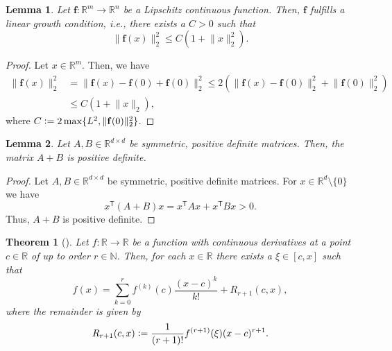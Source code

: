 \documentclass[12pt]{article}
\newtheorem{theorem}{Theorem}[section]
\newtheorem{lemma}[lemma]{Lemma}
\theoremstyle{definition}
\numberwithin{equation}{section}
\newcommand{\N}{\mathbb{N}}
\newcommand{\R}{\mathbb{R}}
\newcommand{\T}{\mathsf{T}}
\newcommand{\norm}[1]{\lVert{#1}\rVert_2}
\newcommand{\defeq}{\vcentcolon=}
\begin{document}
\begin{lemma}
  \label{lemma:linear_growth}
  Let $\mathbf{f} : \R^m \rightarrow \R^n$ be a Lipschitz continuous function. Then, $\mathbf{f}$ fulfills a linear growth condition, i.e., there exists a $C > 0$ such that 
  \begin{equation*}
    \norm{\mathbf{f}(x)}^2 \leq C (1 + \norm{x}^2).
  \end{equation*}
\end{lemma}
\begin{proof}
  Let $x \in \R^m$. Then, we have
  \begin{align*}
    \norm{\mathbf{f}(x)}^2 &= \norm{\mathbf{f}(x) - \mathbf{f}(0) + \mathbf{f}(0)}^2 \leq 2 \left( \norm{\mathbf{f}(x) - \mathbf{f}(0)}^2 + \norm{\mathbf{f}(0)}^2\right) \\
    &\leq C(1+\norm{x}),
  \end{align*}
  where $C \defeq 2\max\{L^2, \norm{\mathbf{f}(0)}^2\}$.
\end{proof}
\begin{lemma}
  \label{lem:sum_positive_definite}
  Let $A,B \in \R^{d \times d}$ be symmetric, positive definite matrices. Then, the matrix $A+B$ is positive definite.
\end{lemma}
\begin{proof}
  Let $A,B \in \R^{d \times d}$ be symmetric, positive definite matrices. For $x \in \R^d \setminus \{0\}$ we have
  \begin{equation*}
    x^\T(A+B)x = x^\T A x + x^\T B x > 0.
  \end{equation*}
  Thus, $A+B$ is positive definite.
\end{proof}
\begin{theorem}[]
  \label{thm:taylor}
  Let $f : \R \rightarrow \R$ be a function with continuous derivatives at a point $c \in \R$ of up to order $r \in \N$. Then, for each $x \in \R$ there exists a $\xi \in [c,x]$ such that 
  \begin{equation*}
    f(x) = \sum_{k=0}^r f^{(k)}(c) \frac{(x-c)^k}{k!} + R_{r+1}(c,x),
  \end{equation*}
  where the \emph{remainder} is given by
  \begin{equation*}
    R_{r+1}(c,x) \defeq \frac{1}{(r+1)!}f^{(r+1)}(\xi)(x-c)^{r+1}.
  \end{equation*}
\end{theorem}
\end{document}
